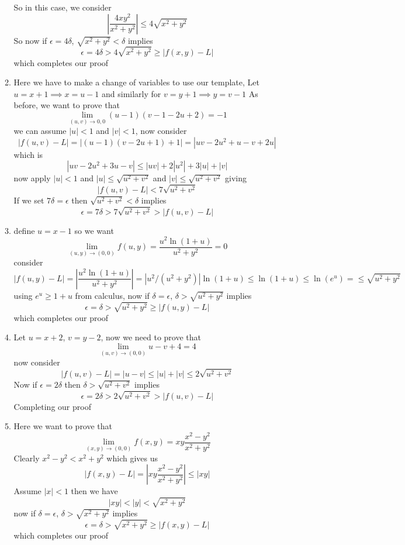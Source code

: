 \documentclass[12pt]{article}
\begin{document}
\begin{enumerate}
\begin{enumerate}
				So in this case, we consider
				$$
				|\frac{4xy^{2}}{x^{2} + y^{2}}| \leq 4\sqrt{ x^{2} + y^{2} }
				$$
				So now if $\epsilon = 4\delta$, $\sqrt{ x^{2} + y^{2} }< \delta$ implies
				$$
				\epsilon = 4\delta > 4\sqrt{ x^{2} + y^{2} } \geq |f(x,y)-L|
				$$
				which completes our proof
			\item
				Here we have to make a change of variables to use our template, 
				Let $u = x+ 1 \implies x = u-1$ and similarly for $v = y +1 \implies y = v-1$
				As before, we want to prove that
				$$
				\lim_{ (u,v) \to 0,0 } (u-1)(v-1-2u + 2)  = -1
				$$
				we can assume $|u|<1$ and $|v|<1$, now consider
				$$
				|f(u,v)-L| = |(u-1)(v-2u+1)+1| = |uv-2u^{2} + u -v + 2u|
				$$
				which is
				$$
				|uv-2u^{2} +3u-v|\leq |uv|+2|u^{2}| +3|u| + |v|
				$$
				now apply $|u|<1$ and $|u|\leq \sqrt{ u^{2} + v^{2} }$ and $|v|\leq \sqrt{ u^{2} + v^{2} }$ giving
				$$
				|f(u,v)-L| < 7\sqrt{ u^{2} + v^{2} }
				$$
				If we set $7\delta  = \epsilon$ then $\sqrt{ u^{2} + v^{2} }<\delta$ implies
				$$
				\epsilon = 7\delta > 7\sqrt{ u^{2} + v^{2} } > |f(u,v)-L|
				$$

			\item
				define $u = x-1$ so we want
				$$
				\lim_{ (u,y) \to (0,0) } f(u,y) = \frac{u^{2}\ln(1 + u)}{u^{2} + y^{2}} =0
				$$
				consider 
				$$
				|f(u,y)-L| = |\frac{u^{2}\ln(1+u)}{u^{2} + y^{2}}| = |u^{2}/(u^{2} + y^{2})| \ln(1 + u) \leq \ln(1 + u) \leq \ln(e^{ u }) = \leq \sqrt{ u^{2} + y^{2} }
				$$
				using $e^{ u}\geq 1+u$ from calculus, now if $\delta = \epsilon$, $\delta > \sqrt{ u^{2} + y^{2} }$ implies
				$$
				\epsilon = \delta > \sqrt{ u^{2} + y^{2} } \geq |f(u,y)-L|
				$$
				which completes our proof

			\item
				Let $u = x + 2$, $v = y-2$, now we need to prove that
				$$
				\lim_{ (u,v) \to (0,0) } u  -v + 4 = 4   
				$$
				now consider 
				$$
				|f(u,v)-L| = |u-v|\leq |u| + |v|\leq 2\sqrt{ u^{2} + v^{2} }
				$$
				Now if $\epsilon = 2\delta$ then $\delta > \sqrt{ u^{2} + v^{2} }$ implies
				$$
				\epsilon = 2\delta > 2\sqrt{ u^{2} + v^{2} } > |f(u,v)-L|
				$$
				Completing our proof

			\item
				Here we want to prove that
				$$
				\lim_{ (x,y) \to (0,0) } f(x,y) = xy \frac{x^{2}-y^{2}}{x^{2} + y^{2}}
				$$
				Clearly $x^{2} -y^{2}<x^{2} + y^{2}$ which gives us
				$$
				|f(x,y)-L| = |xy\frac{x^{2}-y^{2}}{x^{2} + y^{2}}| \leq |xy|
				$$
				Assume $|x|<1$ then we have
				$$
				|xy|< |y|< \sqrt{ x^{2} + y^{2} }
				$$
				now if $\delta = \epsilon$, $\delta > \sqrt{ x^{2} + y^{2} }$ implies
				$$
				\epsilon = \delta > \sqrt{ x^{2} + y^{2} } \geq |f(x,y)-L|
				$$
				which completes our proof


\end{enumerate}
\end{enumerate}
\end{document}

